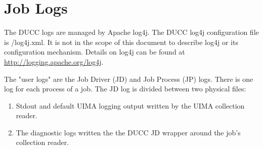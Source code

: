 \ifpdf
\else
{}
\fi
\chapter{Job Logs}
\label{chap:job-logs}

The DUCC logs are managed by Apache log4j.  The DUCC log4j configuration file is
\duccruntime/log4j.xml. It is not in the scope of this document to describe log4j or its
configuration mechanism. Details on log4j can be found at \url{http://logging.apache.org/log4j}.

The "user logs" are the Job Driver (JD) and Job Process (JP) logs. There is one log for each process 
of a job. The JD log is divided between two physical files: 

\begin{enumerate}
   \item Stdout and default UIMA logging output written by the UIMA collection reader. 
     
   \item The diagnostic logs written the the DUCC JD wrapper around the job's collection reader. 
\end{enumerate}

